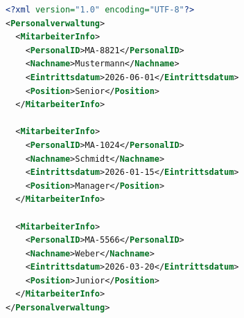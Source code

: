\documentclass[12pt]{scrartcl}
\begin{document}






\begin{lstlisting}[language=XML]
<?xml version="1.0" encoding="UTF-8"?>
<Personalverwaltung>
  <MitarbeiterInfo>
    <PersonalID>MA-8821</PersonalID>
    <Nachname>Mustermann</Nachname>
    <Eintrittsdatum>2026-06-01</Eintrittsdatum>
    <Position>Senior</Position>
  </MitarbeiterInfo>

  <MitarbeiterInfo>
    <PersonalID>MA-1024</PersonalID>
    <Nachname>Schmidt</Nachname>
    <Eintrittsdatum>2026-01-15</Eintrittsdatum>
    <Position>Manager</Position>
  </MitarbeiterInfo>

  <MitarbeiterInfo>
    <PersonalID>MA-5566</PersonalID>
    <Nachname>Weber</Nachname>
    <Eintrittsdatum>2026-03-20</Eintrittsdatum>
    <Position>Junior</Position>
  </MitarbeiterInfo>
</Personalverwaltung>
\end{lstlisting}
\end{document}
